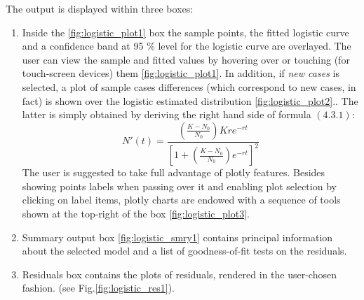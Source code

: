 \documentclass[
12pt, %
a4paper, %
oneside, %
headinclude,footinclude, %
BCOR5mm, %
]{scrartcl}
\begin{document}
The output is displayed within three boxes: 
\begin{enumerate}
\item Inside the \ref{fig:logistic_plot1} box the sample points, the fitted logistic curve and a confidence band at 95 \% level for the logistic curve are overlayed. The user can view the sample and fitted values by hovering over or touching (for touch-screen devices) them \ref{fig:logistic_plot1}. In addition, if \emph{new cases} is selected, a plot of sample cases differences (which correspond to new cases, in fact) is shown over the logistic estimated distribution \ref{fig:logistic_plot2}.. The latter is simply obtained by deriving the right hand side of formula $(4.3.1)$:
\begin{equation}
N'(t) = \frac{(\frac{K-N_0}{N_0})Kre^{-rt}}{[1+(\frac{K-N_0}{N_0})e^{-rt}]^2}
\end{equation}
The user is suggested to take full advantage of plotly features. Besides showing points labels when passing over it and enabling plot selection by clicking on label items, plotly charts are endowed with a sequence of tools shown at the top-right of the box \ref{fig:logistic_plot3}.
\item Summary output box \ref{fig:logistic_smry1} contains principal information about the selected model and a list of goodness-of-fit tests on the residuals. 
\item Residuals box contains the plots of residuals, rendered in the user-chosen fashion. (see Fig.\ref{fig:logistic_res1}).
\end{enumerate}
\end{document}

